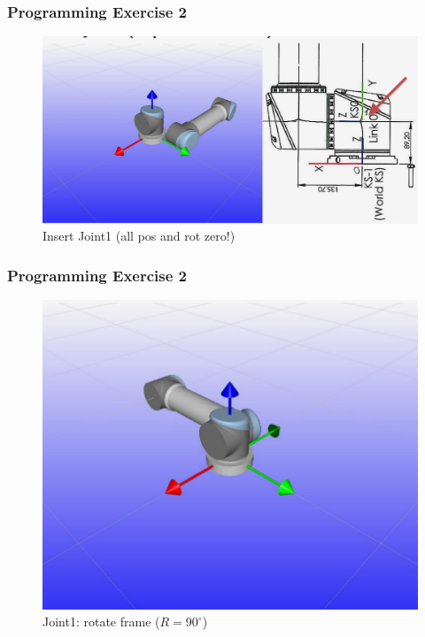 \documentclass{beamer}
\begin{document}

\begin{frame}
  \frametitle{Programming Exercise 2}
  \begin{centering}
    \begin{figure}
    \includegraphics[height=0.6\textheight]{./graphics/ex33_7}
    \caption{Insert Joint1 (all pos and rot zero!)}
    \end{figure}
    \end{centering}
  \end{frame}
  

\begin{frame}
  \frametitle{Programming Exercise 2}
  \begin{centering}
    \begin{figure}
    \includegraphics[height=0.6\textheight]{./graphics/ex33_8}
    \caption{Joint1: rotate frame ($R=90^{\circ}$)}
    \end{figure}
    \end{centering}
  \end{frame}
  
\end{document}
